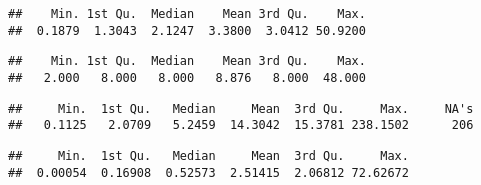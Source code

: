 \documentclass[
]{article}
\newenvironment{Shaded}{\begin{snugshade}}{\end{snugshade}}
\newcommand{\CommentTok}[1]{\textcolor[rgb]{0.56,0.35,0.01}{\textit{#1}}}
\newcommand{\KeywordTok}[1]{\textcolor[rgb]{0.13,0.29,0.53}{\textbf{#1}}}
\newcommand{\NormalTok}[1]{#1}
\newcommand{\OperatorTok}[1]{\textcolor[rgb]{0.81,0.36,0.00}{\textbf{#1}}}
\begin{document}
\begin{verbatim}
##    Min. 1st Qu.  Median    Mean 3rd Qu.    Max. 
##  0.1879  1.3043  2.1247  3.3800  3.0412 50.9200
\end{verbatim}

\begin{Shaded}
\end{Shaded}

\begin{verbatim}
##    Min. 1st Qu.  Median    Mean 3rd Qu.    Max. 
##   2.000   8.000   8.000   8.876   8.000  48.000
\end{verbatim}

\begin{Shaded}
\end{Shaded}

\begin{verbatim}
##     Min.  1st Qu.   Median     Mean  3rd Qu.     Max.     NA's 
##   0.1125   2.0709   5.2459  14.3042  15.3781 238.1502      206
\end{verbatim}

\begin{Shaded}
\end{Shaded}

\begin{verbatim}
##     Min.  1st Qu.   Median     Mean  3rd Qu.     Max. 
##  0.00054  0.16908  0.52573  2.51415  2.06812 72.62672
\end{verbatim}
\end{document}
